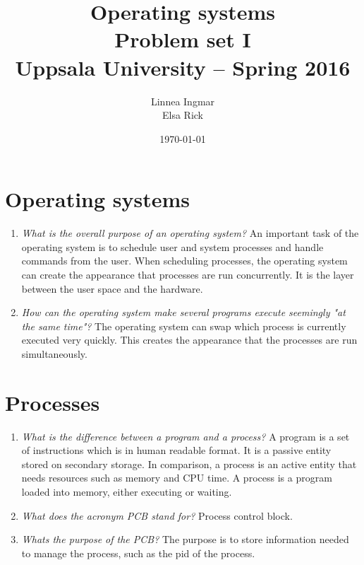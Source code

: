 \documentclass[a4paper]{article}
\title{\textbf{Operating systems \\
    Problem set I \\
    Uppsala University -- Spring 2016 \\}}
\author{Linnea Ingmar \\
  Elsa Rick}
\date{\today}
\begin{document}
\maketitle

\section{Operating systems}
\begin{enumerate}
  \item \textit{What is the overall purpose of an operating system?} 
    An important task of the operating system is to schedule user and system processes and handle commands from the user. When scheduling processes, the operating system can create the appearance that processes are run concurrently. It is the layer between the user space and the hardware.
  \item \textit{How can the operating system make several programs execute seemingly "at the same time"?}
    The operating system can swap which process is currently executed very quickly. This creates the appearance that the processes are run simultaneously.
\end{enumerate}

\section{Processes}
\begin{enumerate}
  \item \textit{What is the difference between a program and a process?}
    A program is a set of instructions which is in human readable format. It is a passive entity stored on secondary storage. In comparison, a process is an active entity that needs resources such as memory and CPU time. A process is a program loaded into memory, either executing or waiting.
  \item \textit{What does the acronym PCB stand for?}
    Process control block.
  \item \textit{Whats the purpose of the PCB?}
    The purpose is to store information needed to manage the process, such as the pid of the process. 
\end{enumerate}
\end{document}
